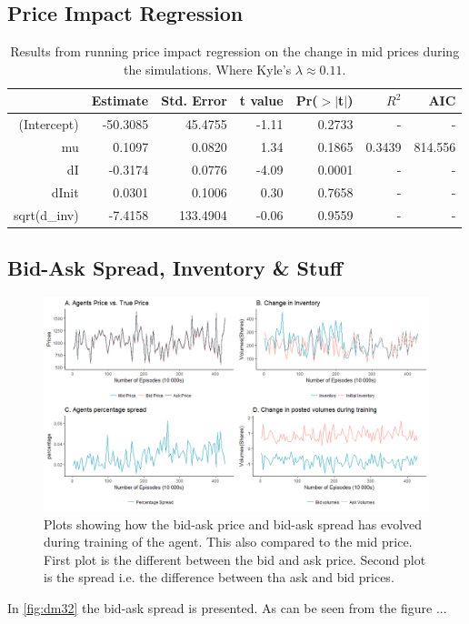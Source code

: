 \documentclass{kththesis}
\theoremstyle{definition}
\begin{document}
\subsection*{Price Impact Regression}
\begin{table}[H]
\centering
\begin{tabular}{rrrrrrr}
  \hline
 & Estimate & Std. Error & t value & Pr($>$$|$t$|$) & $R^{2} $ & AIC  \\ 
 
  \hline
(Intercept) & -50.3085 & 45.4755 & -1.11 & 0.2733 & - & - \\ 
  mu & 0.1097 & 0.0820 & 1.34 & 0.1865 & 0.3439 & 814.556 \\ 
  dI & -0.3174 & 0.0776 & -4.09 & 0.0001 & - & - \\ 
  dInit & 0.0301 & 0.1006 & 0.30 & 0.7658 & - & - \\ 
  sqrt(d\_inv) & -7.4158 & 133.4904 & -0.06 & 0.9559 & - & - \\ 
   \hline
\end{tabular}
\label{tab:pi3}
\caption{Results from running price impact regression on the change in mid prices during the simulations. Where Kyle's $\lambda \approx 0.11$.}
\end{table}

\subsection*{Bid-Ask Spread, Inventory \& Stuff}
\begin{figure}[H]
	    	\centering
		\includegraphics[scale=.5]{lob1_baps_inv_multi.png}
		\caption{Plots showing how the bid-ask price and bid-ask spread has evolved during training of the agent. This also compared to the mid price. First plot is the different between the bid and ask price. Second plot is the spread i.e. the difference between tha ask and bid prices.}
		\label{fig:dm32}
\end{figure}
In \autoref{fig:dm32} the bid-ask spread is presented. As can be seen from the figure ...
\end{document}
